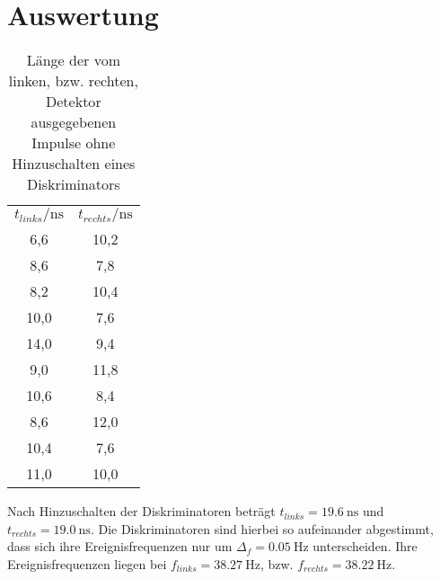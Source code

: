 \section{Auswertung}
\label{sec:Auswertung}

\begin{table}
  \caption{Länge der vom linken, bzw. rechten, Detektor ausgegebenen Impulse ohne Hinzuschalten eines Diskriminators}
  \label{tab:oD}
  \centering
  \begin{tabular}{|S|S|}
    \toprule
    $t_{links}/\si{\nano \second}$ & $t_{rechts}/\si{\nano \second}$\\
    6,6 & 10,2 \\
    8,6 & 7,8 \\
    8,2 & 10,4 \\
    10,0 & 7,6 \\
    14,0 & 9,4 \\
    9,0 & 11,8 \\
    10,6 & 8,4 \\
    8,6 & 12,0 \\
    10,4 & 7,6 \\
    11,0 & 10,0 \\
    \toprule
  \end{tabular}
\end{table}

Nach Hinzuschalten der Diskriminatoren beträgt $t_{links}= \SI{19,6}{\nano\second}$ und $t_{rechts} = \SI{19,0}{\nano \second}$. Die Diskriminatoren sind hierbei so aufeinander abgestimmt, dass sich ihre Ereignisfrequenzen nur um $\Delta_f = \SI{0,05}{\hertz}$ unterscheiden. Ihre Ereignisfrequenzen liegen bei $f_{links} = \SI{38.27}{\hertz}$, bzw. $f_{rechts}= \SI{38,22}{\hertz}$.

